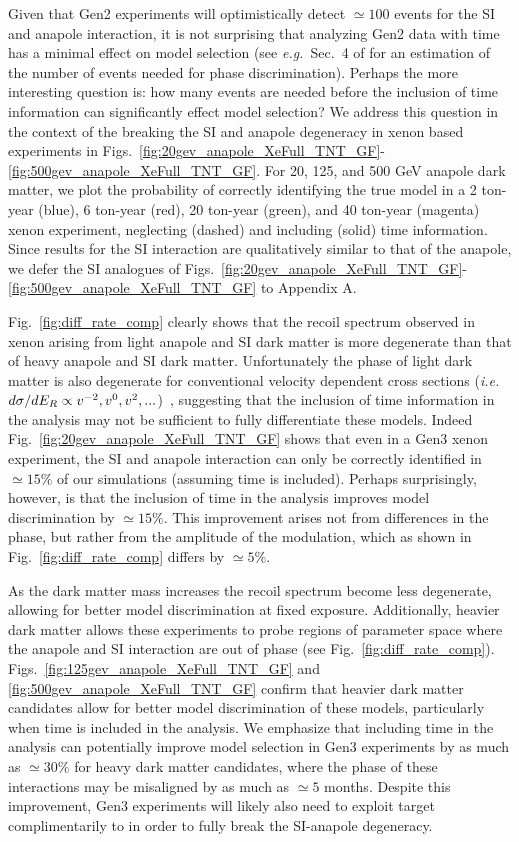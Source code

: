\documentclass[11pt]{article}
\newcommand{\ie}{{\it i.e.~}}  \newcommand{\eg}{{\it e.g.~}}
\newcommand{\Fig}[1]{Fig.~\ref{#1}} \newcommand{\Figs}[2]{Figs.~\ref{#1} and \ref{#2}}
\begin{document}
Given that Gen2 experiments will optimistically detect $\simeq 100$ events for the SI and anapole interaction, it is not surprising that analyzing Gen2 data with time has a minimal effect on model selection (see \eg Sec.~4 of \cite{DelNobile:2015nua} for an estimation of the number of events needed for phase discrimination). Perhaps the more interesting question is: how many events are needed before the inclusion of time information can significantly effect model selection? We address this question in the context of the breaking the SI and anapole degeneracy in xenon based experiments in Figs.~\ref{fig:20gev_anapole_XeFull_TNT_GF}-\ref{fig:500gev_anapole_XeFull_TNT_GF}. For 20, 125, and 500 GeV anapole dark matter, we plot the probability of correctly identifying the true model in a 2 ton-year (blue), 6 ton-year (red), 20 ton-year (green), and 40 ton-year (magenta) xenon experiment, neglecting (dashed) and including (solid) time information. Since results for the SI interaction are qualitatively similar to that of the anapole, we defer the SI analogues of Figs.~\ref{fig:20gev_anapole_XeFull_TNT_GF}-\ref{fig:500gev_anapole_XeFull_TNT_GF} to Appendix A. 

\Fig{fig:diff_rate_comp} clearly shows that the recoil spectrum observed in xenon arising from light anapole and SI dark matter is more degenerate than that of heavy anapole and SI dark matter. Unfortunately the phase of light dark matter is also degenerate for conventional velocity dependent cross sections (\ie $d\sigma/dE_R \propto v^{-2}, v^0, v^2, ...$)~\cite{DelNobile:2015tza,DelNobile:2015rmp}, suggesting that the inclusion of time information in the analysis may not be sufficient to fully differentiate these models. Indeed \Fig{fig:20gev_anapole_XeFull_TNT_GF} shows that even in a Gen3 xenon experiment, the SI and anapole interaction can only be correctly identified in $\simeq 15\%$ of our simulations (assuming time is included). Perhaps surprisingly, however, is that the inclusion of time in the analysis improves model discrimination by $\simeq 15\%$. This improvement arises not from differences in the phase, but rather from the amplitude of the modulation, which as shown in \Fig{fig:diff_rate_comp} differs by $\simeq 5\%$.



As the dark matter mass increases the recoil spectrum become less degenerate, allowing for better model discrimination at fixed exposure. Additionally, heavier dark matter allows these experiments to probe regions of parameter space where the anapole and SI interaction are out of phase (see \Fig{fig:diff_rate_comp}). Figs.~\ref{fig:125gev_anapole_XeFull_TNT_GF} and \ref{fig:500gev_anapole_XeFull_TNT_GF} confirm that heavier dark matter candidates allow for better model discrimination of these models, particularly when time is included in the analysis. We emphasize that including time in the analysis can potentially improve model selection in Gen3 experiments by as much as $\simeq 30\%$ for heavy dark matter candidates, where the phase of these interactions may be misaligned by as much as $\simeq 5$ months. Despite this improvement, Gen3 experiments will likely also need to exploit target complimentarily to in order to fully break the SI-anapole degeneracy. 
\end{document}
